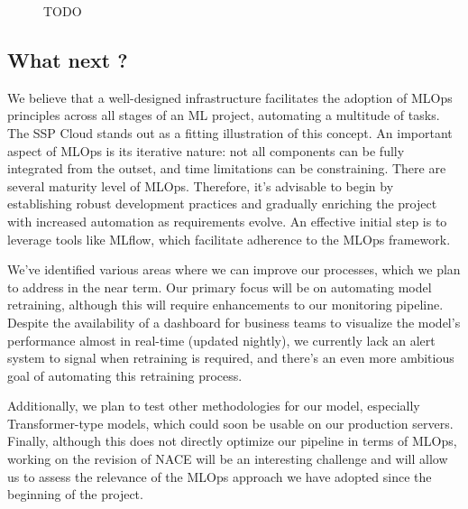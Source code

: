 \begin{figure}[htbp]
    \centering
    \caption{TODO}
    \label{fig:annotation-datalab}
\end{figure}

\subsection{What next ?}

We believe that a well-designed infrastructure facilitates the adoption of MLOps principles across all stages of an ML project, automating a multitude of tasks. The SSP Cloud stands out as a fitting illustration of this concept.
An important aspect of MLOps is its iterative nature: not all components can be fully integrated from the outset, and time limitations can be constraining. There are several maturity level of MLOps. Therefore, it's advisable to begin by establishing robust development practices and gradually enriching the project with increased automation as requirements evolve. An effective initial step is to leverage tools like MLflow, which facilitate adherence to the MLOps framework.

We've identified various areas where we can improve our processes, which we plan to address in the near term. Our primary focus will be on automating model retraining, although this will require enhancements to our monitoring pipeline. Despite the availability of a dashboard for business teams to visualize the model's performance almost in real-time (updated nightly), we currently lack an alert system to signal when retraining is required, and there's an even more ambitious goal of automating this retraining process.


Additionally, we plan to test other methodologies for our model, especially Transformer-type models, which could soon be usable on our production servers. Finally, although this does not directly optimize our pipeline in terms of MLOps, working on the revision of NACE will be an interesting challenge and will allow us to assess the relevance of the MLOps approach we have adopted since the beginning of the project.
